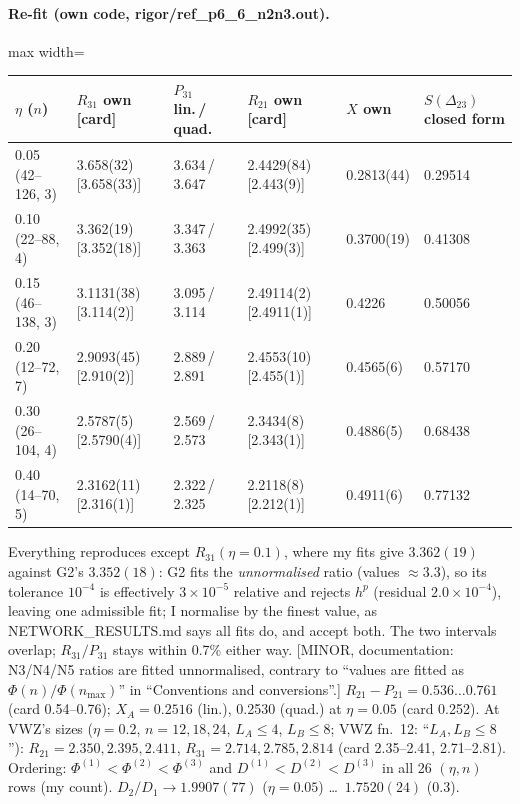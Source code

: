\documentclass[11pt]{article}
\begin{document}
\paragraph{Re-fit (own code, rigor/ref\_p6\_6\_n2n3.out).}
\begin{center}\small
\begin{adjustbox}{max width=\textwidth}\begin{tabular}{llllll}
\toprule
$\eta$ ($n$) & $R_{31}$ own [card] & $P_{31}$ lin.\,/\,quad. & $R_{21}$ own [card] & $X$ own & $S(\Delta_{23})$ closed form\\
\midrule
0.05 (42--126, 3) & 3.658(32) [3.658(33)] & 3.634\,/\,3.647 & 2.4429(84) [2.443(9)] & 0.2813(44) & 0.29514\\
0.10 (22--88, 4) & 3.362(19) [3.352(18)] & 3.347\,/\,3.363 & 2.4992(35) [2.499(3)] & 0.3700(19) & 0.41308\\
0.15 (46--138, 3) & 3.1131(38) [3.114(2)] & 3.095\,/\,3.114 & 2.49114(2) [2.4911(1)] & 0.4226 & 0.50056\\
0.20 (12--72, 7) & 2.9093(45) [2.910(2)] & 2.889\,/\,2.891 & 2.4553(10) [2.455(1)] & 0.4565(6) & 0.57170\\
0.30 (26--104, 4) & 2.5787(5) [2.5790(4)] & 2.569\,/\,2.573 & 2.3434(8) [2.343(1)] & 0.4886(5) & 0.68438\\
0.40 (14--70, 5) & 2.3162(11) [2.316(1)] & 2.322\,/\,2.325 & 2.2118(8) [2.212(1)] & 0.4911(6) & 0.77132\\
\bottomrule
\end{tabular}\end{adjustbox}
\end{center}
Everything reproduces except $R_{31}(\eta=0.1)$, where my fits give $3.362(19)$ against G2's $3.352(18)$: G2
fits the \emph{unnormalised} ratio (values $\approx3.3$), so its tolerance $10^{-4}$ is effectively $3\times10^{-5}$
relative and rejects $h^p$ (residual $2.0\times10^{-4}$), leaving one admissible fit; I normalise by the finest
value, as NETWORK\_RESULTS.md says all fits do, and accept both. The two intervals overlap; $R_{31}/P_{31}$ stays
within 0.7\% either way. [MINOR, documentation: N3/N4/N5 ratios are fitted unnormalised, contrary to
``values are fitted as $\Phi(n)/\Phi(n_{\max})$'' in ``Conventions and conversions''.]
$R_{21}-P_{21}=0.536\dots0.761$ (card 0.54--0.76); $X_A=0.2516$ (lin.), 0.2530 (quad.) at $\eta=0.05$ (card 0.252).
At VWZ's sizes ($\eta=0.2$, $n=12,18,24$, $L_A\le4$, $L_B\le8$; VWZ fn.~12: ``$L_A,L_B\le8$''): $R_{21}=2.350,
2.395,2.411$, $R_{31}=2.714,2.785,2.814$ (card 2.35--2.41, 2.71--2.81). Ordering: $\Phi^{(1)}<\Phi^{(2)}<\Phi^{(3)}$
and $D^{(1)}<D^{(2)}<D^{(3)}$ in all 26 $(\eta,n)$ rows (my count). $D_2/D_1\to1.9907(77)$ ($\eta=0.05$) \ldots\
$1.7520(24)$ ($0.3$).
\end{document}
